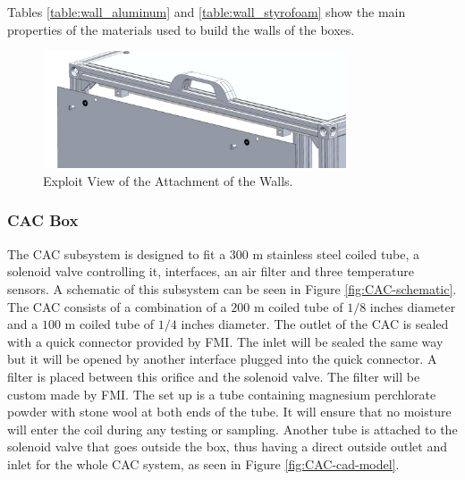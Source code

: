 \documentclass[a4paper,12pt,twoside]{article}
\begin{document}
Tables \ref{table:wall_aluminum} and \ref{table:wall_styrofoam} show the main properties of the materials used to build the walls of the boxes.

 \begin{figure}[H]
     \centering
     \includegraphics[width=0.8\textwidth]{4-experiment-design/img/Mechanical/wall_attachment.jpg}
     \caption{Exploit View of the Attachment of the Walls.}
     \label{fig:wall_attach}
\end{figure}

\subsubsection{CAC Box}

The CAC subsystem is designed to fit a $300$ m stainless steel coiled tube, a solenoid valve controlling it, interfaces, an air filter and three temperature sensors. A schematic of this subsystem can be seen in Figure \ref{fig:CAC-schematic}. The CAC consists of a combination of a $200$ m coiled tube of $1/8$ inches diameter and a $100$ m coiled tube of $1/4$ inches diameter. The outlet of the CAC is sealed with a quick connector provided by FMI. The inlet will be sealed the same way but it will be opened by another interface plugged into the quick connector. A filter is placed between this orifice and the solenoid valve. The filter will be custom made by FMI. The set up is a tube containing magnesium perchlorate powder with stone wool at both ends of the tube. It will ensure that no moisture will enter the coil during any testing or sampling. Another tube is attached to the solenoid valve that goes outside the box, thus having a direct outside outlet and inlet for the whole CAC system, as seen in Figure \ref{fig:CAC-cad-model}.

\end{document}
